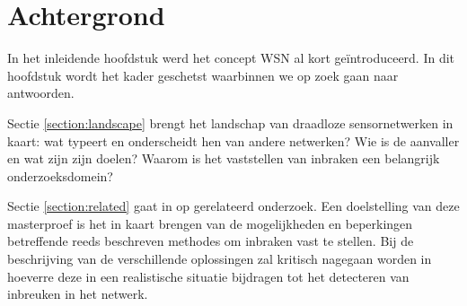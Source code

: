 
\chapter{Achtergrond}
\label{chapter:achtergrond}

In het inleidende hoofdstuk werd het concept WSN al kort ge\"introduceerd. In
dit hoofdstuk wordt het kader geschetst waarbinnen we op zoek gaan naar
antwoorden.

Sectie \ref{section:landscape} brengt het landschap van draadloze
sensornetwerken in kaart: wat typeert en onderscheidt hen van andere netwerken?
Wie is de aanvaller en wat zijn zijn doelen? Waarom is het vaststellen van
inbraken een belangrijk onderzoeksdomein?

Sectie \ref{section:related} gaat in op gerelateerd onderzoek. Een doelstelling
van deze masterproef is het in kaart brengen van de mogelijkheden en
beperkingen betreffende reeds beschreven methodes om inbraken vast te stellen.
Bij de beschrijving van de verschillende oplossingen zal kritisch nagegaan
worden in hoeverre deze in een realistische situatie bijdragen tot het
detecteren van inbreuken in het netwerk.



